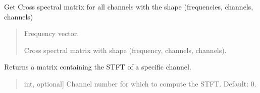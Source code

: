 \documentclass[letterpaper,10pt,english]{sphinxmanual}
\begin{document}
\begin{fulllineitems}

\begin{fulllineitems}
\label{\detokenize{classes:dsptools.classes.signal_class.Signal.get_csm}}
\pysigstartsignatures
{}
\pysigstopsignatures
\sphinxAtStartPar
Get Cross spectral matrix for all channels with the shape
(frequencies, channels, channels)
\begin{quote}\begin{description}
\begin{description}
\sphinxlineitem{\sphinxstylestrong{f\_csm}}{[}\sphinxtitleref{np.ndarray}{]}
\sphinxAtStartPar
Frequency vector.

\sphinxlineitem{\sphinxstylestrong{csm}}{[}\sphinxtitleref{np.ndarray}{]}
\sphinxAtStartPar
Cross spectral matrix with shape (frequency, channels, channels).

\end{description}

\end{description}\end{quote}

\end{fulllineitems}


\begin{fulllineitems}
\label{\detokenize{classes:dsptools.classes.signal_class.Signal.get_spectrogram}}
\pysigstartsignatures
{}
\pysigstopsignatures
\sphinxAtStartPar
Returns a matrix containing the STFT of a specific channel.
\begin{quote}\begin{description}
\begin{description}
\sphinxlineitem{\sphinxstylestrong{channel\_number}}{[}int, optional{]}
\sphinxAtStartPar
Channel number for which to compute the STFT. Default: 0.


\end{description}
\end{description}
\end{quote}
\end{fulllineitems}
\end{fulllineitems}
\end{document}
